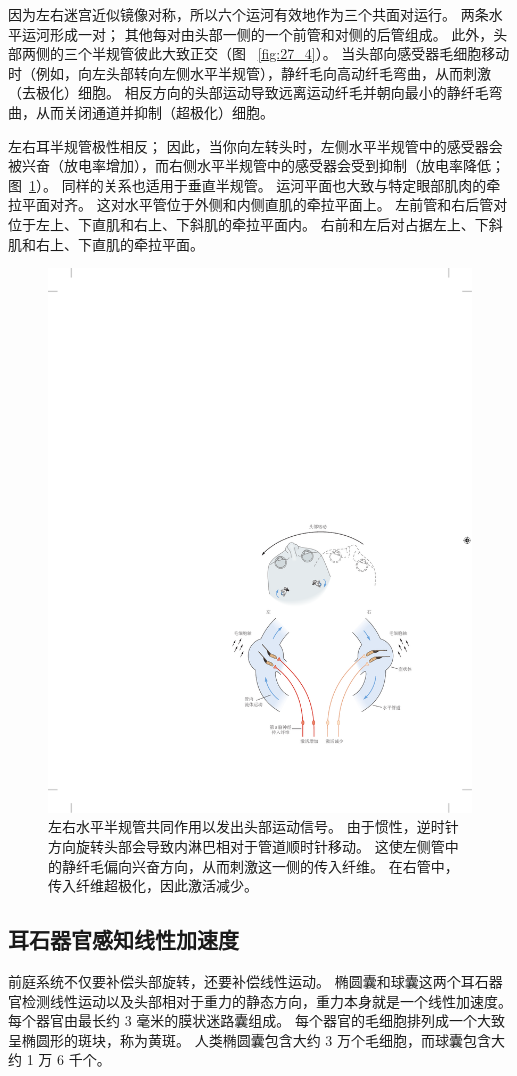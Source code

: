 因为左右迷宫近似镜像对称，所以六个运河有效地作为三个共面对运行。
两条水平运河形成一对； 其他每对由头部一侧的一个前管和对侧的后管组成。
此外，头部两侧的三个半规管彼此大致正交（图 ~\ref{fig:27_4}）。
当头部向感受器毛细胞移动时（例如，向左头部转向左侧水平半规管），静纤毛向高动纤毛弯曲，从而刺激（去极化）细胞。
相反方向的头部运动导致远离运动纤毛并朝向最小的静纤毛弯曲，从而关闭通道并抑制（超极化）细胞。


左右耳半规管极性相反；
因此，当你向左转头时，左侧水平半规管中的感受器会被兴奋（放电率增加），而右侧水平半规管中的感受器会受到抑制（放电率降低；图~\ref{fig:27_5}）。
同样的关系也适用于垂直半规管。
运河平面也大致与特定眼部肌肉的牵拉平面对齐。
这对水平管位于外侧和内侧直肌的牵拉平面上。
左前管和右后管对位于左上、下直肌和右上、下斜肌的牵拉平面内。
右前和左后对占据左上、下斜肌和右上、下直肌的牵拉平面。


\begin{figure}[htbp]
	\centering
	\includegraphics[width=0.6\linewidth]{chap27/fig_27_5}
	\caption{左右水平半规管共同作用以发出头部运动信号。
		由于惯性，逆时针方向旋转头部会导致内淋巴相对于管道顺时针移动。
		这使左侧管中的静纤毛偏向兴奋方向，从而刺激这一侧的传入纤维。
		在右管中，传入纤维超极化，因此激活减少。}
	\label{fig:27_5}
\end{figure}



\subsection{耳石器官感知线性加速度}

前庭系统不仅要补偿头部旋转，还要补偿线性运动。
椭圆囊和球囊这两个耳石器官检测线性运动以及头部相对于重力的静态方向，重力本身就是一个线性加速度。
每个器官由最长约 3 毫米的膜状迷路囊组成。
每个器官的毛细胞排列成一个大致呈椭圆形的斑块，称为黄斑。
人类椭圆囊包含大约 3 万个毛细胞，而球囊包含大约 1 万 6 千个。


